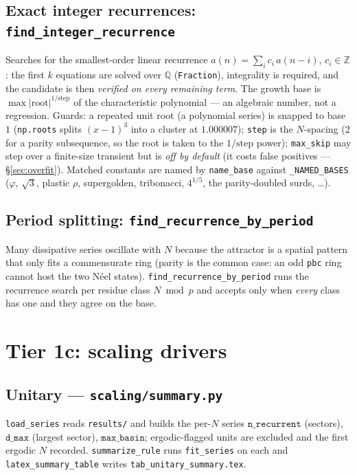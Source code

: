 \documentclass[11pt]{article}
\newcommand{\rt}[1]{\texttt{#1}}
\newcommand{\pf}[1]{\texttt{#1}}          %
\newcommand{\fn}[1]{\texttt{#1}}          %
\begin{document}
\subsection{Exact integer recurrences: \fn{find\_integer\_recurrence}}
Searches for the smallest-order linear recurrence
$a(n)=\sum_{i}c_i\,a(n-i)$, $c_i\in\mathbb Z$: the first $k$ equations are solved
over $\mathbb Q$ (\fn{Fraction}), integrality is required, and the candidate is
then \emph{verified on every remaining term}. The growth base is
$\max|\text{root}|^{1/\text{step}}$ of the characteristic polynomial --- an
algebraic number, not a regression. Guards: a repeated unit root (a polynomial
series) is snapped to base $1$ (\fn{np.roots} splits $(x-1)^3$ into a cluster at
$1.000007$); \fn{step} is the $N$-spacing (2 for a parity subsequence, so the
root is taken to the $1/\text{step}$ power); \fn{max\_skip} may step over a
finite-size transient but is \emph{off by default} (it costs false positives ---
\S\ref{sec:overfit}). Matched constants are named by \fn{name\_base} against
\fn{\_NAMED\_BASES} ($\varphi$, $\sqrt3$, plastic $\rho$, supergolden,
tribonacci, $4^{1/5}$, the parity-doubled surds, \dots).

\subsection{Period splitting: \fn{find\_recurrence\_by\_period}}
Many dissipative series oscillate with $N$ because the attractor is a spatial
pattern that only fits a commensurate ring (parity is the common case: an odd
\rt{pbc} ring cannot host the two N\'eel states). \fn{find\_recurrence\_by\_period}
runs the recurrence search per residue class $N\bmod p$ and accepts only when
\emph{every} class has one and they agree on the base.

\section{Tier 1c: scaling drivers}
\label{sec:scaling}

\subsection{Unitary --- \pf{scaling/summary.py}}
\fn{load\_series} reads \pf{results/} and builds the per-$N$ series
$\rt{n\_recurrent}$ (sectors), $\rt{d\_max}$ (largest sector), $\rt{max\_basin}$;
ergodic-flagged units are excluded and the first ergodic $N$ recorded.
\fn{summarize\_rule} runs \fn{fit\_series} on each and \fn{latex\_summary\_table}
writes \pf{tab\_unitary\_summary.tex}.
\end{document}
